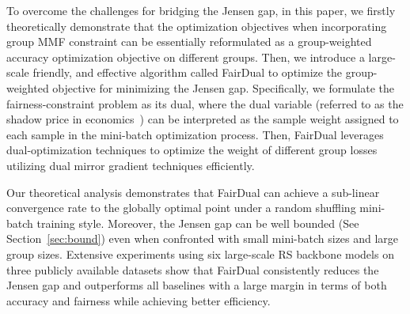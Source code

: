  


To overcome the challenges for bridging the Jensen gap, in this paper, we firstly theoretically demonstrate that the optimization objectives when incorporating group MMF constraint can be essentially reformulated as a group-weighted accuracy optimization objective on different groups.
Then, we introduce a large-scale friendly, and effective algorithm called FairDual
to optimize the group-weighted objective for minimizing the Jensen gap. 
Specifically, we formulate the fairness-constraint problem as its dual, where the dual variable (referred to as the shadow price in economics~\citep{dreze1990policy}) can be interpreted as the sample weight assigned to each sample in the mini-batch optimization process.
Then, FairDual leverages dual-optimization techniques to optimize the weight of different group losses utilizing dual mirror gradient techniques efficiently.




Our theoretical analysis demonstrates that FairDual can achieve a sub-linear convergence rate to the globally optimal point under a random shuffling mini-batch training style. Moreover, the Jensen gap can be well bounded (See Section~\ref{sec:bound}) even when confronted with small mini-batch sizes and large group sizes. Extensive experiments using six large-scale RS backbone models on three publicly available datasets show that FairDual consistently reduces the Jensen gap and outperforms all baselines with a large margin in terms of both accuracy and fairness while achieving better efficiency. 




